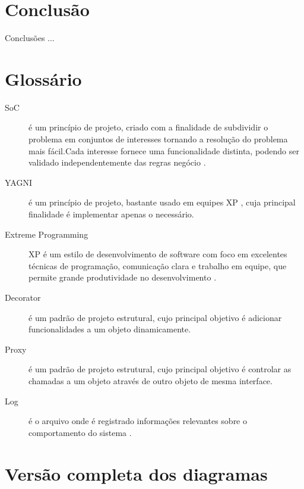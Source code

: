 \documentclass[tc,oneside]{iiufrgs}
\begin{document}
\chapter{Conclusão}

Conclusões ...

\singlespacing



\chapter*{Glossário}

\begin{description}
	\item[SoC] é um princípio de projeto, criado com a finalidade de subdividir o problema em conjuntos de interesses tornando a resolução do problema mais fácil.Cada interesse fornece uma funcionalidade distinta, podendo ser validado independentemente das regras negócio \cite{pressman2010engineering}.
	\item [YAGNI] é um princípio de projeto, bastante usado em equipes XP , cuja principal finalidade é implementar apenas o necessário.
	\item[Extreme Programming] XP é um estilo de desenvolvimento de software com foco em excelentes técnicas de programação, comunicação clara e trabalho em equipe, que permite grande produtividade no desenvolvimento \cite{beck2004extreme}.
\item [Decorator] é um padrão de projeto estrutural, cujo principal objetivo é adicionar funcionalidades a um objeto dinamicamente.
\item [Proxy] é um padrão de projeto estrutural, cujo principal objetivo é controlar as chamadas a um objeto através de outro objeto de mesma interface.
\item [Log] é o arquivo onde é registrado informações relevantes sobre o comportamento do sistema \cite{log}.
\end{description}

\appendix

\chapter{Versão completa dos diagramas}
\label{apend:A}
\end{document}
